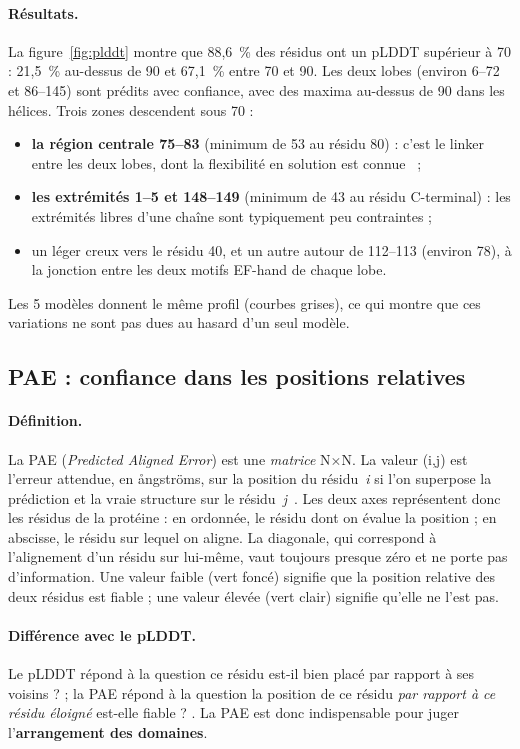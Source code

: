 \paragraph{Résultats.} La figure~\ref{fig:plddt} montre que 88,6~\% des résidus ont un pLDDT supérieur à 70 : 21,5~\% au-dessus de 90 et 67,1~\% entre 70 et 90. Les deux lobes (environ 6–72 et 86–145) sont prédits avec confiance, avec des maxima au-dessus de 90 dans les hélices. Trois zones descendent sous 70 :
\begin{itemize}
  \item \textbf{la région centrale 75–83} (minimum de 53 au résidu 80) : c'est le linker entre les deux lobes, dont la flexibilité en solution est connue~\cite{barbato1992} ;
  \item \textbf{les extrémités 1–5 et 148–149} (minimum de 43 au résidu C-terminal) : les extrémités libres d'une chaîne sont typiquement peu contraintes ;
  \item un léger creux vers le résidu 40, et un autre autour de 112–113 (environ 78), à la jonction entre les deux motifs EF-hand de chaque lobe.
\end{itemize}
Les 5 modèles donnent le même profil (courbes grises), ce qui montre que ces variations ne sont pas dues au hasard d'un seul modèle.

\subsection{PAE : confiance dans les positions relatives}

\paragraph{Définition.} La PAE (\emph{Predicted Aligned Error}) est une \emph{matrice} N$\times$N. La valeur (i,j) est l'erreur attendue, en ångströms, sur la position du résidu~\emph{i} si l'on superpose la prédiction et la vraie structure sur le résidu~\emph{j}~\cite{ebi_course}. Les deux axes représentent donc les résidus de la protéine : en ordonnée, le résidu dont on évalue la position ; en abscisse, le résidu sur lequel on aligne. La diagonale, qui correspond à l'alignement d'un résidu sur lui-même, vaut toujours presque zéro et ne porte pas d'information. Une valeur faible (vert foncé) signifie que la position relative des deux résidus est fiable ; une valeur élevée (vert clair) signifie qu'elle ne l'est pas.

\paragraph{Différence avec le pLDDT.} Le pLDDT répond à la question \og ce résidu est-il bien placé par rapport à ses voisins ? \fg{} ; la PAE répond à la question \og la position de ce résidu \emph{par rapport à ce résidu éloigné} est-elle fiable ? \fg{}. La PAE est donc indispensable pour juger l'\textbf{arrangement des domaines}.

